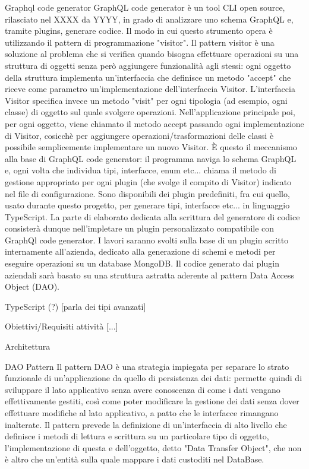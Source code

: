     Graphql code generator
        GraphQL code generator è un tool CLI open source, rilasciato nel XXXX da YYYY, in grado di analizzare uno schema GraphQL e, tramite plugins, generare codice.
        Il modo in cui questo strumento opera è utilizzando il pattern di programmazione "visitor".
        Il pattern visitor è una soluzione al problema che si verifica quando bisogna effettuare operazioni su una struttura di oggetti senza però aggiungere funzionalità agli stessi:
        ogni oggetto della struttura implementa un'interfaccia che definisce un metodo "accept" che riceve come parametro un'implementazione dell'interfaccia Visitor.
        L'interfaccia Visitor specifica invece un metodo "visit" per ogni tipologia (ad esempio, ogni classe) di oggetto sul quale svolgere operazioni.
        Nell'applicazione principale poi, per ogni oggetto, viene chiamato il metodo accept passando ogni implementazione di Visitor, cosicchè per aggiungere operazioni/trasformazioni delle classi è possibile semplicemente implementare un nuovo Visitor.
        È questo il meccanismo alla base di GraphQL code generator: il programma naviga lo schema GraphQL e, ogni volta che individua tipi, interfacce, enum etc... chiama il metodo di gestione appropriato per ogni plugin (che svolge il compito di Visitor) indicato nel file di configurazione.
        Sono disponibili dei plugin predefiniti, fra cui quello, usato durante questo progetto, per generare tipi, interfacce etc... in linguaggio TypeScript.
        La parte di elaborato dedicata alla scrittura del generatore di codice consisterà dunque nell'impletare un plugin personalizzato compatibile con GraphQl code generator.
        I lavori saranno svolti sulla base di un plugin scritto internamente all'azienda, dedicato alla generazione di schemi e metodi per eseguire operazioni su un database MongoDB.
        Il codice generato dai plugin aziendali sarà basato su una struttura astratta aderente al pattern Data Access Object (DAO).

    TypeScript (?)
        [parla dei tipi avanzati]

Obiettivi/Requisiti attività
    [...]

Architettura

    DAO Pattern
        Il pattern DAO è una strategia impiegata per separare lo strato funzionale di un'applicazione da quello di persistenza dei dati: permette quindi di sviluppare il lato applicativo senza avere conoscenza di come i dati vengano effettivamente gestiti, così come poter modificare la gestione dei dati
        senza dover effettuare modifiche al lato applicativo, a patto che le interfacce rimangano inalterate.
        Il pattern prevede la definizione di un'interfaccia di alto livello che definisce i metodi di lettura e scrittura su un particolare tipo di oggetto, l'implementazione di questa e dell'oggetto, detto "Data Transfer Object", che non è altro che un'entità sulla quale mappare i dati custoditi nel DataBase.
        
